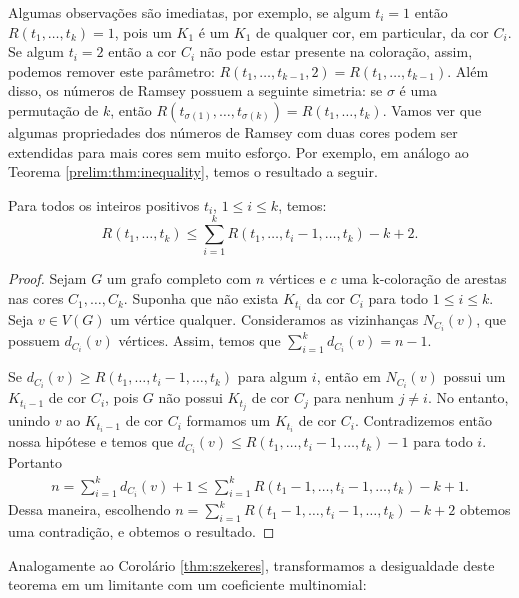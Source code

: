 Algumas observações são imediatas, por exemplo, se algum $t_i = 1$ então $R(t_1, \dots, t_k) = 1$, pois um $K_1$ é um $K_1$ de qualquer cor, em particular, da cor $C_i$. Se algum $t_i = 2$ então a cor $C_i$ não pode estar presente na coloração, assim, podemos remover este parâmetro: $R(t_1, \dots, t_{k-1}, 2) = R(t_1, \dots, t_{k-1})$. Além disso, os números de Ramsey possuem a seguinte simetria: se $\sigma$ é uma permutação de $k$, então
$R(t_{\sigma(1)}, \dots, t_{\sigma(k)}) = R(t_1, \dots, t_k)$. Vamos ver que algumas propriedades dos números de Ramsey com duas cores podem ser extendidas para mais cores sem muito esforço. Por exemplo, em análogo ao Teorema \ref{prelim:thm:inequality}, temos o resultado a seguir.

\begin{theorem}
\label{prelim:thm:multi_inequality}
Para todos os inteiros positivos $t_i$, $1 \leq i \leq k$, temos:
\[ R(t_1, \dots, t_k) \leq \sum_{i=1}^{k} R(t_1, \dots, t_i - 1, \dots, t_k) - k + 2. \]
\end{theorem}
\begin{proof}
Sejam $G$ um grafo completo com $n$ vértices e $c$ uma k-coloração de arestas nas cores $C_1, \dots, C_k$. Suponha que não exista $K_{t_i}$ da cor $C_i$ para todo $1 \leq i \leq k$. Seja $v \in V(G)$ um vértice qualquer. Consideramos as vizinhanças $N_{C_i}(v)$, que possuem $d_{C_i}(v)$ vértices. Assim, temos que $\sum_{i=1}^{k} d_{C_i}(v) = n-1$.

Se $d_{C_i}(v) \geq R(t_1, \dots, t_i - 1, \dots, t_k)$ para algum $i$, então em $N_{C_i}(v)$ possui um $K_{t_i - 1}$ de cor $C_i$, pois $G$ não possui $K_{t_j}$ de cor $C_j$ para nenhum $j \neq i$. No entanto, unindo $v$ ao $K_{t_i - 1}$ de cor $C_i$ formamos um $K_{t_i}$ de cor $C_i$.
Contradizemos então nossa hipótese e temos que $d_{C_i}(v) \leq R(t_1, \dots, t_i - 1, \dots, t_k) - 1$ para todo $i$. Portanto
\begin{align*}
n = \sum_{i=1}^{k} d_{C_i}(v)  + 1 \leq \sum_{i=1}^{k} R(t_1 - 1, \dots, t_i - 1, \dots, t_k) - k + 1.
\end{align*}
Dessa maneira, escolhendo $n = \sum_{i=1}^{k} R(t_1 - 1, \dots, t_i - 1, \dots, t_k) - k + 2$ obtemos uma contradição, e obtemos o resultado.
\end{proof}

Analogamente ao Corolário \ref{thm:szekeres}, transformamos a desigualdade deste teorema em um limitante com um coeficiente multinomial:


